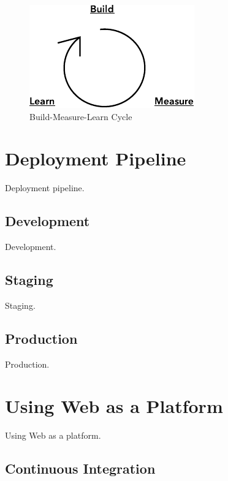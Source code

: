 \documentclass[english]{tktltiki2}
\begin{document}
\begin{figure}[h!]

    \vspace{1cm}
    \centering

    \includegraphics{figures/build-measure-learn}

    \caption{Build-Measure-Learn Cycle}
    \label{figure:build-measure-learn}

\end{figure}


\section{Deployment Pipeline}

Deployment pipeline.

\subsection{Development}

Development.

\subsection{Staging}

Staging.

\subsection{Production}

Production.


\section{Using Web as a Platform}

Using Web as a platform.

\subsection{Continuous Integration}
\end{document}
